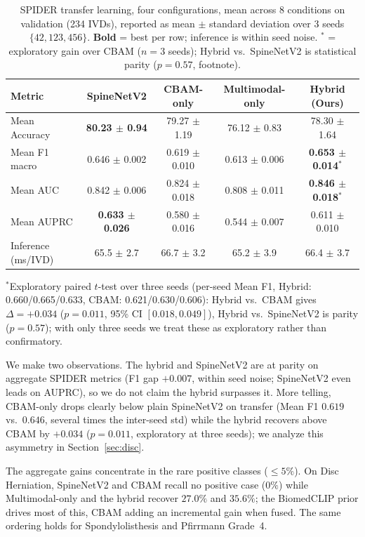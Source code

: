 \documentclass[runningheads]{llncs}
\newcommand{\best}[1]{\textcolor{best}{\textbf{#1}}}
\begin{document}
\begin{table}[ht]
\centering
\caption{SPIDER transfer learning, four configurations, mean across 8 conditions on validation (234 IVDs), reported as mean $\pm$ standard deviation over 3 seeds $\{42, 123, 456\}$. \textbf{Bold} = best per row; inference is within seed noise. $^\ast$ = exploratory gain over CBAM ($n=3$ seeds); Hybrid vs.\ SpineNetV2 is statistical parity ($p=0.57$, footnote).}
\label{tab:spider_transfer_agg}
\footnotesize
\begin{tabular}{@{}lcccc@{}}
\toprule
Metric & SpineNetV2 & CBAM-only & Multimodal-only & Hybrid (Ours) \\
\midrule
Mean Accuracy & \best{80.23 $\pm$ 0.94} & 79.27 $\pm$ 1.19 & 76.12 $\pm$ 0.83 & 78.30 $\pm$ 1.64 \\
Mean F1 macro & 0.646 $\pm$ 0.002 & 0.619 $\pm$ 0.010 & 0.613 $\pm$ 0.006 & \best{0.653 $\pm$ 0.014}$^\ast$ \\
Mean AUC      & 0.842 $\pm$ 0.006 & 0.824 $\pm$ 0.018 & 0.808 $\pm$ 0.011 & \best{0.846 $\pm$ 0.018}$^\ast$ \\
Mean AUPRC    & \best{0.633 $\pm$ 0.026} & 0.580 $\pm$ 0.016 & 0.544 $\pm$ 0.007 & 0.611 $\pm$ 0.010 \\
\midrule
Inference (ms/IVD) & 65.5 $\pm$ 2.7 & 66.7 $\pm$ 3.2 & 65.2 $\pm$ 3.9 & 66.4 $\pm$ 3.7 \\
\bottomrule
\end{tabular}

\vspace{2pt}
{\raggedright\scriptsize
$^\ast$Exploratory paired $t$-test over three seeds (per-seed Mean F1, Hybrid: 0.660/0.665/0.633, CBAM: 0.621/0.630/0.606): Hybrid vs.\ CBAM gives $\Delta=+0.034$ ($p=0.011$, 95\% CI $[0.018,0.049]$), Hybrid vs.\ SpineNetV2 is parity ($p=0.57$); with only three seeds we treat these as exploratory rather than confirmatory.\par}
\end{table}

We make two observations. The hybrid and SpineNetV2 are at parity on aggregate SPIDER metrics (F1 gap $+0.007$, within seed noise; SpineNetV2 even leads on AUPRC), so we do not claim the hybrid surpasses it. More telling, CBAM-only drops clearly below plain SpineNetV2 on transfer (Mean F1 $0.619$ vs.\ $0.646$, several times the inter-seed std) while the hybrid recovers above CBAM by $+0.034$ ($p=0.011$, exploratory at three seeds); we analyze this asymmetry in Section~\ref{sec:disc}.

The aggregate gains concentrate in the rare positive classes ($\leq 5\%$). On Disc Herniation, SpineNetV2 and CBAM recall no positive case ($0\%$) while Multimodal-only and the hybrid recover $27.0\%$ and $35.6\%$; the BiomedCLIP prior drives most of this, CBAM adding an incremental gain when fused. The same ordering holds for Spondylolisthesis and Pfirrmann Grade~4.
\end{document}
